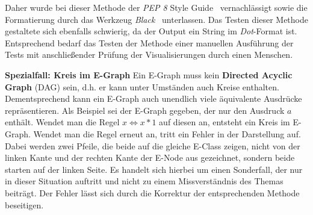 Daher wurde bei dieser Methode der \textit{PEP 8} Style Guide~\cite{pep} vernachlässigt sowie die Formatierung durch das Werkzeug \textit{Black}~\cite{black} unterlassen.
Das Testen dieser Methode gestaltete sich ebenfalls schwierig, da der Output ein String im \textit{Dot}-Format ist. Entsprechend bedarf das Testen der Methode
einer manuellen Ausführung der Tests mit anschließender Prüfung der Visualisierungen durch einen Menschen.

\noindent\textbf{Spezialfall: Kreis im E-Graph} Ein E-Graph muss kein \textbf{Directed Acyclic Graph} (DAG) sein, d.h. er kann unter Umständen auch Kreise enthalten. 
Dementsprechend kann ein E-Graph auch unendlich viele äquivalente Ausdrücke repräsentieren.
Als Beispiel sei der E-Graph gegeben, der nur den Ausdruck $a$ enthält. Wendet man die Regel $x \Leftrightarrow x * 1$ auf diesen an, entsteht ein Kreis im E-Graph.
Wendet man die Regel erneut an, tritt ein Fehler in der Darstellung auf. Dabei werden zwei Pfeile, die beide auf die gleiche E-Class zeigen, nicht von der linken Kante und der rechten
Kante der E-Node aus gezeichnet, sondern beide starten auf der linken Seite. Es handelt sich hierbei um einen Sonderfall, der nur in dieser Situation auftritt und nicht zu einem 
Missverständnis des Themas beiträgt. Der Fehler lässt sich durch die Korrektur der entsprechenden Methode beseitigen.
